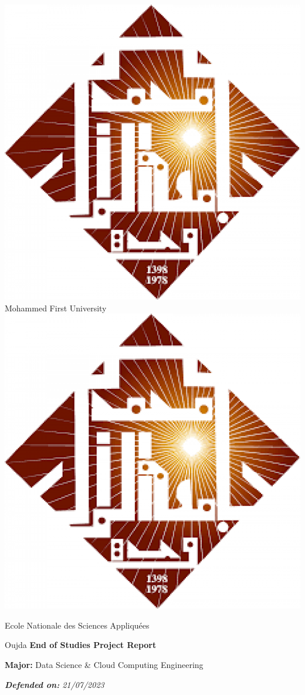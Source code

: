 \documentclass[a4paper,12pt,twoside]{report}
\begin{document}
\begin{titlepage}

\selectfont

\begin{center}
    \includegraphics[scale=0.1]{images/ump}\hfill
    \LARGE Mohammed First University\hfill
    \includegraphics[scale=0.1]{images/ump}\par
    \Large Ecole Nationale des Sciences Appliquées\par
    \Large Oujda\vfill
    \Large\textbf{End of Studies Project Report}\par
    \large\textbf{Major:} Data Science \& Cloud Computing Engineering\par
    \textit{\textbf{Defended on:} 21/07/2023}\par
\end{center}


\end{titlepage}
\end{document}
